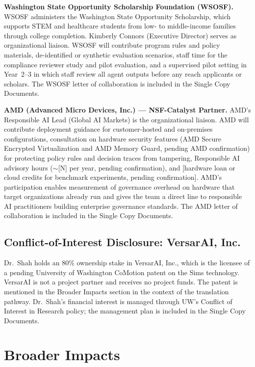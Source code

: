 \documentclass[11pt]{article}
\begin{document}
\textbf{Washington State Opportunity Scholarship Foundation (WSOSF).} WSOSF administers the Washington State Opportunity Scholarship, which supports STEM and healthcare students from low- to middle-income families through college completion. Kimberly Connors (Executive Director) serves as organizational liaison. WSOSF will contribute program rules and policy materials, de-identified or synthetic evaluation scenarios, staff time for the compliance reviewer study and pilot evaluation, and a supervised pilot setting in Year~2--3 in which staff review all agent outputs before any reach applicants or scholars. The WSOSF letter of collaboration is included in the Single Copy Documents.

\textbf{AMD (Advanced Micro Devices, Inc.) --- NSF-Catalyst Partner.} AMD's Responsible AI Lead (Global AI Markets) is the organizational liaison. AMD will contribute deployment guidance for customer-hosted and on-premises configurations, consultation on hardware security features (AMD Secure Encrypted Virtualization and AMD Memory Guard, pending AMD confirmation) for protecting policy rules and decision traces from tampering, Responsible AI advisory hours ($\sim$[N] per year, pending confirmation), and [hardware loan or cloud credits for benchmark experiments, pending confirmation]. AMD's participation enables measurement of governance overhead on hardware that target organizations already run and gives the team a direct line to responsible AI practitioners building enterprise governance standards. The AMD letter of collaboration is included in the Single Copy Documents.

\subsection{Conflict-of-Interest Disclosure: VersarAI, Inc.}

Dr.\ Shah holds an 80\% ownership stake in VersarAI, Inc., which is the licensee of a pending University of Washington CoMotion patent on the Sims technology. VersarAI is not a project partner and receives no project funds. The patent is mentioned in the Broader Impacts section in the context of the translation pathway. Dr.\ Shah's financial interest is managed through UW's Conflict of Interest in Research policy; the management plan is included in the Single Copy Documents.

\section{Broader Impacts}
\end{document}
